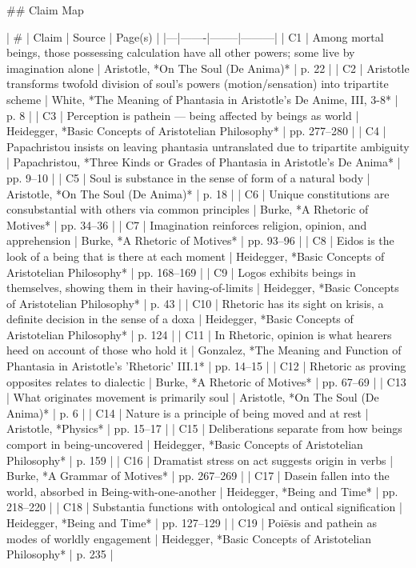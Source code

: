 ## Claim Map

| # | Claim | Source | Page(s) |
|---|-------|--------|---------|
| C1 | Among mortal beings, those possessing calculation have all other powers; some live by imagination alone | Aristotle, *On The Soul (De Anima)* | p. 22 |
| C2 | Aristotle transforms twofold division of soul's powers (motion/sensation) into tripartite scheme | White, *The Meaning of Phantasia in Aristotle's De Anime, III, 3-8* | p. 8 |
| C3 | Perception is pathein — being affected by beings as world | Heidegger, *Basic Concepts of Aristotelian Philosophy* | pp. 277–280 |
| C4 | Papachristou insists on leaving phantasia untranslated due to tripartite ambiguity | Papachristou, *Three Kinds or Grades of Phantasia in Aristotle's De Anima* | pp. 9–10 |
| C5 | Soul is substance in the sense of form of a natural body | Aristotle, *On The Soul (De Anima)* | p. 18 |
| C6 | Unique constitutions are consubstantial with others via common principles | Burke, *A Rhetoric of Motives* | pp. 34–36 |
| C7 | Imagination reinforces religion, opinion, and apprehension | Burke, *A Rhetoric of Motives* | pp. 93–96 |
| C8 | Eidos is the look of a being that is there at each moment | Heidegger, *Basic Concepts of Aristotelian Philosophy* | pp. 168–169 |
| C9 | Logos exhibits beings in themselves, showing them in their having-of-limits | Heidegger, *Basic Concepts of Aristotelian Philosophy* | p. 43 |
| C10 | Rhetoric has its sight on krisis, a definite decision in the sense of a doxa | Heidegger, *Basic Concepts of Aristotelian Philosophy* | p. 124 |
| C11 | In Rhetoric, opinion is what hearers heed on account of those who hold it | Gonzalez, *The Meaning and Function of Phantasia in Aristotle's 'Rhetoric' III.1* | pp. 14–15 |
| C12 | Rhetoric as proving opposites relates to dialectic | Burke, *A Rhetoric of Motives* | pp. 67–69 |
| C13 | What originates movement is primarily soul | Aristotle, *On The Soul (De Anima)* | p. 6 |
| C14 | Nature is a principle of being moved and at rest | Aristotle, *Physics* | pp. 15–17 |
| C15 | Deliberations separate from how beings comport in being-uncovered | Heidegger, *Basic Concepts of Aristotelian Philosophy* | p. 159 |
| C16 | Dramatist stress on act suggests origin in verbs | Burke, *A Grammar of Motives* | pp. 267–269 |
| C17 | Dasein fallen into the world, absorbed in Being-with-one-another | Heidegger, *Being and Time* | pp. 218–220 |
| C18 | Substantia functions with ontological and ontical signification | Heidegger, *Being and Time* | pp. 127–129 |
| C19 | Poiēsis and pathein as modes of worldly engagement | Heidegger, *Basic Concepts of Aristotelian Philosophy* | p. 235 |

